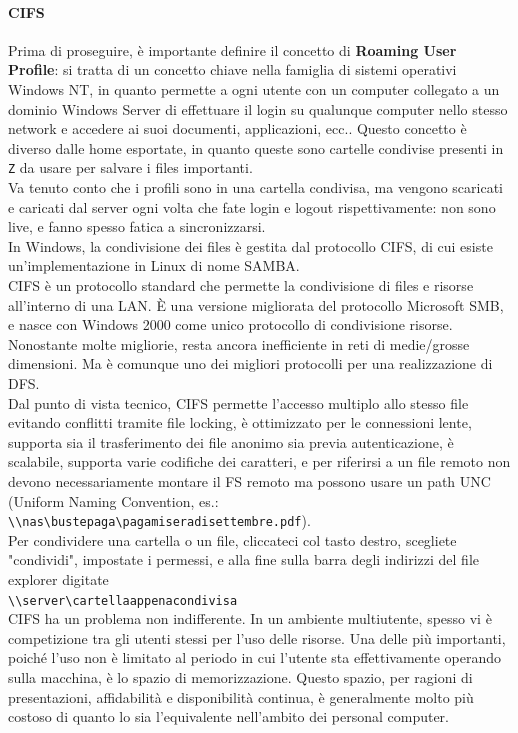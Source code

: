 \documentclass[a4paper]{report}
\newcommand\tab[1][1cm]{\hspace*{#1}}
\begin{document}
\paragraph{CIFS} Prima di proseguire, è importante definire il concetto di \textbf{Roaming User Profile}: si tratta di un concetto chiave nella famiglia di sistemi operativi Windows NT, in quanto permette a ogni utente con un computer collegato a un dominio Windows Server di effettuare il login su qualunque computer nello stesso network e accedere ai suoi documenti, applicazioni, ecc.. Questo concetto è diverso dalle home esportate, in quanto queste sono cartelle condivise presenti in \texttt{Z} da usare per salvare i files importanti.\\
Va tenuto conto che i profili sono in una cartella condivisa, ma vengono scaricati e caricati dal server ogni volta che fate login e logout rispettivamente: non sono live, e fanno spesso fatica a sincronizzarsi.\\
In Windows, la condivisione dei files è gestita dal protocollo CIFS, di cui esiste un'implementazione in Linux di nome SAMBA.\\
CIFS è un protocollo standard che permette la condivisione di files e risorse all'interno di una LAN. È una versione migliorata del protocollo Microsoft SMB, e nasce con Windows 2000 come unico protocollo di condivisione risorse.\\
Nonostante molte migliorie, resta ancora inefficiente in reti di medie/grosse dimensioni. Ma è comunque uno dei migliori protocolli per una realizzazione di DFS.\\
Dal punto di vista tecnico, CIFS permette l'accesso multiplo allo stesso file evitando conflitti tramite file locking, è ottimizzato per le connessioni lente, supporta sia il trasferimento dei file anonimo sia previa autenticazione, è scalabile, supporta varie codifiche dei caratteri, e per riferirsi a un file remoto non devono necessariamente montare il FS remoto ma possono usare un path UNC (Uniform Naming Convention, es.: \texttt{\textbackslash\textbackslash nas\textbackslash bustepaga\textbackslash pagamiseradisettembre.pdf}).\\
Per condividere una cartella o un file, cliccateci col tasto destro, scegliete "condividi", impostate i permessi, e alla fine sulla barra degli indirizzi del file explorer digitate\\
\tab\texttt{\textbackslash\textbackslash server\textbackslash cartellaappenacondivisa}\\
CIFS ha un problema non indifferente. In un ambiente multiutente, spesso vi è competizione tra gli utenti stessi per l'uso delle risorse. Una delle più importanti, poiché l'uso non è limitato al periodo in cui l'utente sta effettivamente operando sulla macchina, è lo spazio di memorizzazione. Questo spazio, per ragioni di presentazioni, affidabilità e disponibilità continua, è generalmente molto più costoso di quanto lo sia l'equivalente nell'ambito dei personal computer. \\
\end{document}

